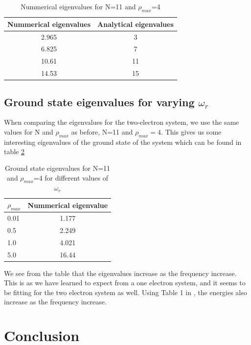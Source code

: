 \documentclass{article}
\begin{document}
\begin{table}[H]
    \centering
    \begin{tabular}{|c|c|}
    \hline
     Nummerical eigenvalues & Analytical eigenvalues\\
     \hline
      2.965  &  3\\
      6.825  &  7\\
      10.61  &  11\\
      14.53  &  15\\
     \hline
    \end{tabular}
    \caption{Nummerical eigenvalues for N=11 and $\rho_{max}$=4}
    \label{tabelur1}
\end{table}

\subsection{Ground state eigenvalues for varying $\omega_r$}

When comparing the eigenvalues for the two-electron system, we use the same values for N and $\rho_{max}$ as before, N=11 and $\rho_{max}=4$. This gives us some interesting eigenvalues of the ground state of the system which can be found in table \ref{tabelur2}

\begin{table}[H]
    \centering
    \begin{tabular}{|l|c|}
    \hline
    $\rho_{max}$ & Nummerical eigenvalue \\
    \hline
    0.01 & 1.177  \\
    0.5  & 2.249  \\
    1.0 & 4.021  \\
    5.0 &  16.44  \\
     \hline
    \end{tabular}
    \caption{Ground state eigenvalues for N=11 and $\rho_{max}$=4 for different values of $\omega_r$}
    \label{tabelur2}
\end{table}

We see from the table that the eigenvalues increase as the frequency increase. This is as we have learned to expect from a one electron system, and it seems to be fitting for the two electron system as well. Using Table 1 in \cite{M.Tant}, the energies also increase as the frequency increase.

\section{Conclusion}
\end{document}
